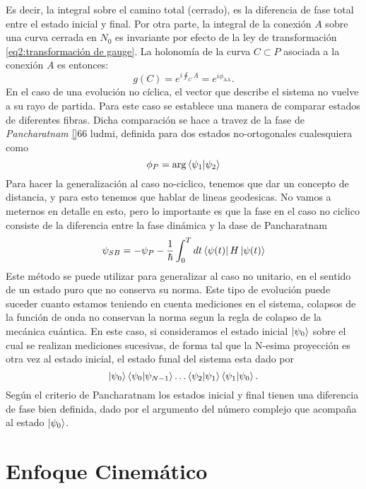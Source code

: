 Es decir, la integral sobre el camino total (cerrado), es la diferencia de fase total entre el estado inicial y final. Por otra parte, la integral de la conexión \( A \) sobre una curva cerrada en \( N_0 \) es invariante por efecto de la ley de transformación \ref{eq2:transformación de gauge}. La holonomía de la curva \( C \subset P \) asociada a la conexión \( A \) es entonces:
\begin{equation}
g(C) = e^{i \oint_C A} = e^{i\phi_{\text{AA}}}.
\end{equation}
En el caso de una evolución no cíclica, el vector que describe el sistema no vuelve a su rayo de partida. Para este caso se establece una manera de comparar estados de diferentes fibras. Dicha comparación se hace a travez de la fase de \textit{Pancharatnam} \ref{}66 ludmi, definida para dos estados no-ortogonales cualesquiera como
\begin{equation}
    \phi_P = \arg \braket{\psi_1}{\psi_2}
\end{equation}
Para hacer la generalización al caso no-ciclico, tenemos que dar un concepto de distancia, y para esto tenemos que hablar de lineas geodesicas. No vamos a meternos en detalle en esto, pero lo importante es que la fase en el caso no ciclico consiste de la diferencia entre la fase dinámica y la dase de Pancharatnam
\begin{equation}
    \psi_{SB}=-\psi_P-\frac{1}{\hbar}\int_0^Tdt\bra{\psi(t)}H\ket{\psi(t)}
\end{equation}
Este método se puede utilizar para generalizar al caso no unitario, en el sentido de un estado puro que no conserva su norma. Este tipo de evolución puede suceder cuanto estamos teniendo en cuenta mediciones en el sistema, colapsos de la función de onda no conservan la norma segun la regla de colapso de la mecánica cuántica. En este caso, si consideramos el estado inicial $\ket{\psi_0}$ sobre el cual se realizan mediciones sucesivas, de forma tal que la N-esima proyección es otra vez al estado inicial, el estado funal del sistema esta dado por
\begin{equation}
    \ket{\psi_0}\braket{\psi_0}{\psi_{N-1}}\dots\braket{\psi_2}{\psi_1}\braket{\psi_1}{\psi_0}.
\end{equation}
Según el criterio de Pancharatnam los estados inicial y final tienen una diferencia de fase bien definida, dado por el argumento del número complejo que acompaña al estado $\ket{\psi_0}$.


\section{Enfoque Cinemático}\label{sec2:cinematico}

